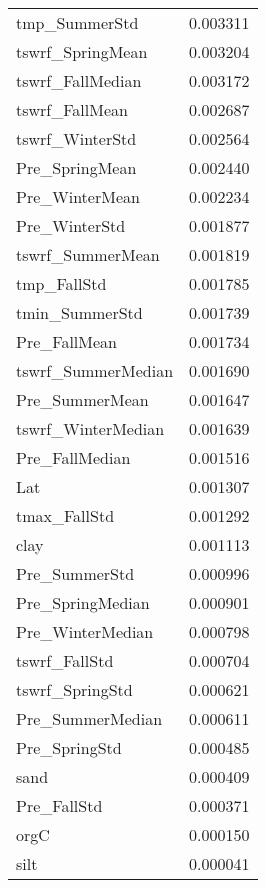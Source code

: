 \begin{tabular}{lr}
tmp_SummerStd & 0.003311 \\
tswrf_SpringMean & 0.003204 \\
tswrf_FallMedian & 0.003172 \\
tswrf_FallMean & 0.002687 \\
tswrf_WinterStd & 0.002564 \\
Pre_SpringMean & 0.002440 \\
Pre_WinterMean & 0.002234 \\
Pre_WinterStd & 0.001877 \\
tswrf_SummerMean & 0.001819 \\
tmp_FallStd & 0.001785 \\
tmin_SummerStd & 0.001739 \\
Pre_FallMean & 0.001734 \\
tswrf_SummerMedian & 0.001690 \\
Pre_SummerMean & 0.001647 \\
tswrf_WinterMedian & 0.001639 \\
Pre_FallMedian & 0.001516 \\
Lat & 0.001307 \\
tmax_FallStd & 0.001292 \\
clay & 0.001113 \\
Pre_SummerStd & 0.000996 \\
Pre_SpringMedian & 0.000901 \\
Pre_WinterMedian & 0.000798 \\
tswrf_FallStd & 0.000704 \\
tswrf_SpringStd & 0.000621 \\
Pre_SummerMedian & 0.000611 \\
Pre_SpringStd & 0.000485 \\
sand & 0.000409 \\
Pre_FallStd & 0.000371 \\
orgC & 0.000150 \\
silt & 0.000041 \\
\bottomrule
\end{tabular}
